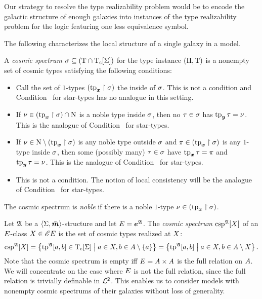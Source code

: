 Our strategy to resolve the type realizability problem would be to encode the
galactic structure of enough galaxies into instances of the type
realizability problem for the logic featuring one less equivalence symbol.

The following characterizes the local structure of a single galaxy in
a model.
\begin{definition}
A \emph{cosmic spectrum} $\sigma \subseteq (\mathrm{T} \cap \mathrm{T}_{\mathrm{c}}[\mathrm{\Sigma}])$ for the
type instance $(\Pi,\mathrm{T})$ is a nonempty set of cosmic types satisfying
the following conditions:
\begin{itemize}
  \item[\cspcondIp]\label{cond:csp-Ip}
  Call the set of $1$-types $(\operatorname{tp}_{\bm{x}}\restriction\sigma)$ the inside of $\sigma$.
  This is not a condition and Condition~ for star-types has no
  analogue in this setting.
  \item[\cspcondIIp]\label{cond:csp-IIp}
  If $\nu \in (\operatorname{tp}_{\bm{x}}\restriction\sigma) \cap \mathrm{\mathrm{N}}$ is a noble type
  inside $\sigma$, then no $\tau \in \sigma$ has $\operatorname{tp}_{\bm{y}}\tau = \nu$.
  This is the analogue of Condition~ for star-types.
  \item[\cspcondIIIp]\label{cond:csp-IIIp}
  If $\nu \in \mathrm{\mathrm{N}} \setminus (\operatorname{tp}_{\bm{x}}\restriction\sigma)$ is any noble type outside
  $\sigma$ and $\pi \in (\operatorname{tp}_{\bm{x}}\restriction\sigma)$ is any $1$-type inside
  $\sigma$, then some (possibly many) $\tau \in \sigma$ have 
  $\operatorname{tp}_{\bm{x}}\tau = \pi$ and $\operatorname{tp}_{\bm{y}}\tau = \nu$.
  This is the analogue of Condition~ for star-types.
  \item[\cspcondIVp]\label{cond:csp-IVp}
  This is not a condition. The notion of local consistency
  will be the analogue of Condition~ for star-types.
\end{itemize}
The cosmic spectrum is \emph{noble} if there is a noble $1$-type $\nu \in
(\operatorname{tp}_{\bm{x}}\restriction\sigma)$.
\end{definition}
\begin{definition}
Let $\mathfrak{A}$ be a $\left\langle \mathrm{\Sigma},\bar{\bm{m}} \right\rangle$-structure and let $E = \bm{e}^{\mathfrak{A}}$.
The \emph{cosmic spectrum} $\operatorname{csp}^{\mathfrak{A}}[X]$ of an $E$-class
$X \in {\mathscr{E}E}$ is the set of cosmic types realized at $X$:
\[
  \operatorname{csp}^{\mathfrak{A}}[X] = \left\{\operatorname{tp}^{\mathfrak{A}}[a,b] \in \mathrm{T}_{\mathrm{c}}[\mathrm{\Sigma}]\mathrel{}\middle|\mathrel{}a\in X, b 
  \in A\setminus\left\{a\right\}\right\} = \left\{\operatorname{tp}^{\mathfrak{A}}[a,b]\mathrel{}\middle|\mathrel{}a \in X, b \in
  A \setminus X\right\}.
\]
Note that the cosmic spectrum is empty iff $E = A\times A$ is the
full relation on $A$.
We will concentrate on the case where $E$ is not the full relation,
since the full relation is trivially definable in $\mathcal{L}^{2}$. This enables us to
consider models with nonempty cosmic spectrums of their galaxies without loss
of generality.
\end{definition}
